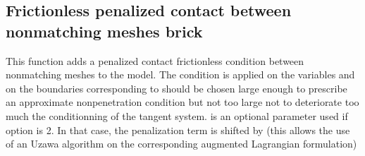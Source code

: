 \documentclass[a4paper,11pt,english]{sphinxmanual}
\begin{document}
\subsection{Frictionless penalized contact between non\sphinxhyphen{}matching meshes brick}
\label{\detokenize{userdoc/model_contact_friction:frictionless-penalized-contact-between-non-matching-meshes-brick}}
\begin{sphinxVerbatim}[commandchars=\\\{\}]
        
            
\end{sphinxVerbatim}

This function adds a penalized contact frictionless condition between nonmatching
meshes to the model.
The condition is applied on the variables  and 
on the boundaries corresponding to  should be chosen
large enough to prescribe an approximate non\sphinxhyphen{}penetration condition
but not too large not to deteriorate too much the conditionning of
the tangent system.  is an optional parameter used if
option is 2. In that case, the penalization term is shifted by 
(this allows the use of an Uzawa algorithm on the corresponding augmented
Lagrangian formulation)
\end{document}
